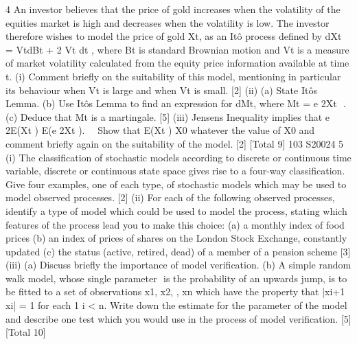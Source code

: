 \documentclass[a4paper,12pt]{article}
\begin{document}
\begin{enumerate}

4 An investor believes that the price of gold increases when the volatility of the equities
market is high and decreases when the volatility is low. The investor therefore wishes
to model the price of gold Xt, as an Itô process defined by dXt = VtdBt + 2
Vt dt , where
Bt is standard Brownian motion and Vt is a measure of market volatility calculated
from the equity price information available at time t.
(i) Comment briefly on the suitability of this model, mentioning in particular its
behaviour when Vt is large and when Vt is small. [2]
(ii) (a) State Itôs Lemma.
(b) Use Itôs Lemma to find an expression for dMt, where Mt = e 2Xt  .
(c) Deduce that Mt is a martingale. [5]
(iii) Jensens Inequality implies that
e 2E(Xt ) E(e 2Xt ).   
Show that E(Xt )  X0 whatever the value of X0 and comment briefly again
on the suitability of the model. [2]
[Total 9]
103 S20024
5 (i) The classification of stochastic models according to discrete or continuous
time variable, discrete or continuous state space gives rise to a four-way
classification. Give four examples, one of each type, of stochastic models
which may be used to model observed processes. [2]
(ii) For each of the following observed processes, identify a type of model which
could be used to model the process, stating which features of the process lead
you to make this choice:
(a) a monthly index of food prices
(b) an index of prices of shares on the London Stock Exchange, constantly
updated
(c) the status (active, retired, dead) of a member of a pension scheme [3]
(iii) (a) Discuss briefly the importance of model verification.
(b) A simple random walk model, whose single parameter  is the
probability of an upwards jump, is to be fitted to a set of observations
{x1, x2, , xn} which have the property that |xi+1  xi| = 1 for each 1 
 i
< n. Write down the estimate for the parameter of the model and
describe one test which you would use in the process of model
verification. [5]
[Total 10]




\end{enumerate}
\end{document}
